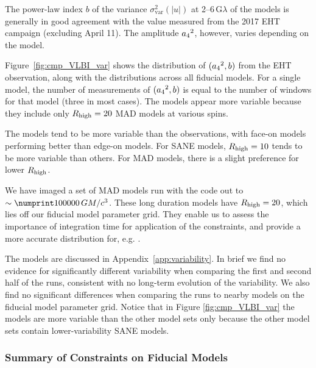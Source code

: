 The power-law index $b$ of the variance $\sigma_\text{var}^2 (|u|)$ at 2--6\,G$\lambda$ of the models is generally in good agreement with the value measured  from the 2017 EHT campaign (excluding April 11).
The amplitude ${a_4}^2$, however, varies depending on the model.

Figure~\ref{fig:cmp_VLBI_var} shows the distribution of $({a_4}^2, b)$ from the EHT observation, along with the distributions across all fiducial models.
For a single model, the number of measurements of $({a_4}^2, b)$ is equal to the number of windows for that model (three in most cases).  The \koral models appear more variable because they include only $R_\mathrm{high} = 20$ MAD models at various spins.

The models tend to be more variable than the observations, with face-on models performing better than edge-on models.
For SANE models, $R_\mathrm{high} = 10$ tends to be more variable than others.
For MAD models, there is a slight preference for lower $R_\mathrm{high}$.


We have imaged a set of MAD models run with the \koral code out to $\sim \no{100000}\,\tg$.  These long duration  models have $R_\mathrm{high} = 20$, which lies off our fiducial model parameter grid.  They enable us to assess the importance of integration time for application of the constraints, and provide a more accurate distribution for, e.g. .

The \koral models are discussed in Appendix~\ref{app:variability}. In brief we find no evidence for significantly different variability when comparing the first and second half of the \koral runs, consistent with no long-term evolution of the variability.  We also find no significant differences when comparing the \koral runs to nearby models on the fiducial model parameter grid.  Notice that in Figure \ref{fig:cmp_VLBI_var} the \koral models are more variable than the other model sets only because the other model sets contain lower-variability SANE models.

\subsubsection{Summary of Constraints on Fiducial Models}
\label{sec:summarythermal}





